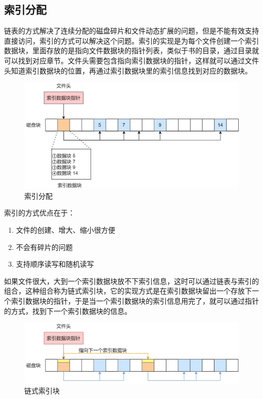 \subsection{索引分配}

链表的方式解决了连续分配的磁盘碎片和文件动态扩展的问题，但是不能有效支持直接访问，索引的方式可以解决这个问题。索引的实现是为每个文件创建一个索引数据块，里面存放的是指向文件数据块的指针列表，类似于书的目录，通过目录就可以找到对应章节。文件头需要包含指向索引数据块的指针，这样就可以通过文件头知道索引数据块的位置，再通过索引数据块里的索引信息找到对应的数据块。

\begin{figure}[H]
	\centering
	\includegraphics[scale=0.35]{img/C5/5-4/5.png}
	\caption{索引分配}
\end{figure}

索引的方式优点在于：

\begin{enumerate}
	\item 文件的创建、增大、缩小很方便
	\item 不会有碎片的问题
	\item 支持顺序读写和随机读写
\end{enumerate}

如果文件很大，大到一个索引数据块放不下索引信息，这时可以通过链表与索引的组合，这种组合称为链式索引块，它的实现方式是在索引数据块留出一个存放下一个索引数据块的指针，于是当一个索引数据块的索引信息用完了，就可以通过指针的方式，找到下一个索引数据块的信息。

\begin{figure}[H]
	\centering
	\includegraphics[scale=0.4]{img/C5/5-4/6.png}
	\caption{链式索引块}
\end{figure}

